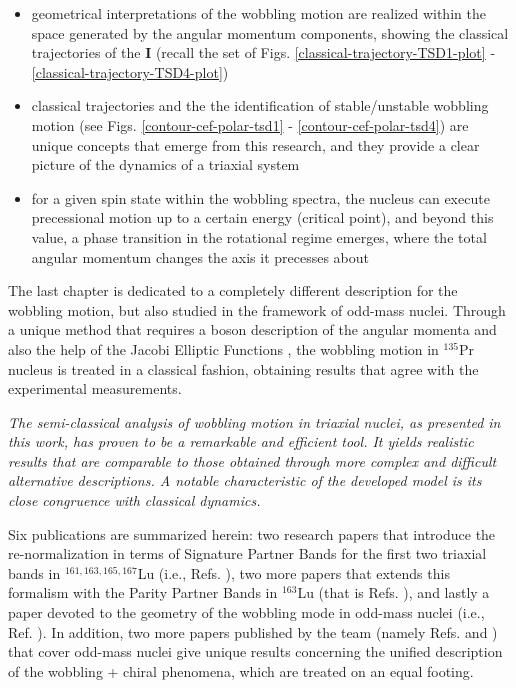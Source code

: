 \begin{itemize}
    \item geometrical interpretations of the wobbling motion are realized within the space generated by the angular momentum components, showing the classical trajectories of the $\mathbf{I}$ (recall the set of Figs. \ref{classical-trajectory-TSD1-plot} - \ref{classical-trajectory-TSD4-plot})
    \item classical trajectories and the the identification of stable/unstable wobbling motion (see Figs. \ref{contour-cef-polar-tsd1} - \ref{contour-cef-polar-tsd4}) are unique concepts that emerge from this research, and they provide a clear picture of the dynamics of a triaxial system
    \item for a given spin state within the wobbling spectra, the nucleus can execute precessional motion up to a certain energy (critical point), and beyond this value, a phase transition in the rotational regime emerges, where the total angular momentum changes the axis it precesses about
\end{itemize}

The last chapter is dedicated to a completely different description for the wobbling motion, but also studied in the framework of odd-mass nuclei. Through a unique method that requires a boson description of the angular momenta and also the help of the Jacobi Elliptic Functions \cite{jacobi1829fundamenta}, the wobbling motion in $^{135}$Pr nucleus is treated in a classical fashion, obtaining results that agree with the experimental measurements.

\emph{The semi-classical analysis of wobbling motion in triaxial nuclei, as presented in this work, has proven to be a remarkable and efficient tool. It yields realistic results that are comparable to those obtained through more complex and difficult alternative descriptions. A notable characteristic of the developed model is its close congruence with classical dynamics.}

Six publications are summarized herein: two research papers that introduce the re-normalization in terms of Signature Partner Bands for the first two triaxial bands in $^{161,163,165,167}$Lu (i.e., Refs. \cite{raduta2020approach,raduta2020towards}), two more papers that extends this formalism with the Parity Partner Bands in $^{163}$Lu (that is Refs. \cite{poenaru2021parity,poenaru2021extensive1}), and lastly a paper devoted to the geometry of the wobbling mode in odd-mass nuclei (i.e., Ref. \cite{poenaru2021extensive2}). In addition, two more papers published by the team (namely Refs. \cite{raduta2020new} and \cite{raduta2022simultaneous}) that cover odd-mass nuclei give unique results concerning the unified description of the wobbling + chiral phenomena, which are treated on an equal footing.